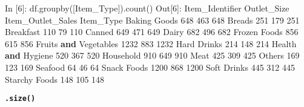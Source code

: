 \documentclass[
]{book}
\newenvironment{Shaded}{\begin{snugshade}}{\end{snugshade}}
\newcommand{\DecValTok}[1]{\textcolor[rgb]{0.00,0.00,0.81}{#1}}
\newcommand{\KeywordTok}[1]{\textcolor[rgb]{0.13,0.29,0.53}{\textbf{#1}}}
\newcommand{\NormalTok}[1]{#1}
\newcommand{\StringTok}[1]{\textcolor[rgb]{0.31,0.60,0.02}{#1}}
\begin{document}
\begin{Shaded}
\begin{Highlighting}[]
\NormalTok{In [}\DecValTok{6}\NormalTok{]: df.groupby([}\StringTok{\textquotesingle{}Item\_Type\textquotesingle{}}\NormalTok{]).count() }
\NormalTok{Out[}\DecValTok{6}\NormalTok{]:}
\NormalTok{                       Item\_Identifier  Outlet\_Size  Item\_Outlet\_Sales}
\NormalTok{Item\_Type                                                             }
\NormalTok{Baking Goods                       }\DecValTok{648}          \DecValTok{463}                \DecValTok{648}
\NormalTok{Breads                             }\DecValTok{251}          \DecValTok{179}                \DecValTok{251}
\NormalTok{Breakfast                          }\DecValTok{110}           \DecValTok{79}                \DecValTok{110}
\NormalTok{Canned                             }\DecValTok{649}          \DecValTok{471}                \DecValTok{649}
\NormalTok{Dairy                              }\DecValTok{682}          \DecValTok{496}                \DecValTok{682}
\NormalTok{Frozen Foods                       }\DecValTok{856}          \DecValTok{615}                \DecValTok{856}
\NormalTok{Fruits }\KeywordTok{and}\NormalTok{ Vegetables             }\DecValTok{1232}          \DecValTok{883}               \DecValTok{1232}
\NormalTok{Hard Drinks                        }\DecValTok{214}          \DecValTok{148}                \DecValTok{214}
\NormalTok{Health }\KeywordTok{and}\NormalTok{ Hygiene                 }\DecValTok{520}          \DecValTok{367}                \DecValTok{520}
\NormalTok{Household                          }\DecValTok{910}          \DecValTok{649}                \DecValTok{910}
\NormalTok{Meat                               }\DecValTok{425}          \DecValTok{309}                \DecValTok{425}
\NormalTok{Others                             }\DecValTok{169}          \DecValTok{123}                \DecValTok{169}
\NormalTok{Seafood                             }\DecValTok{64}           \DecValTok{46}                 \DecValTok{64}
\NormalTok{Snack Foods                       }\DecValTok{1200}          \DecValTok{868}               \DecValTok{1200}
\NormalTok{Soft Drinks                        }\DecValTok{445}          \DecValTok{312}                \DecValTok{445}
\NormalTok{Starchy Foods                      }\DecValTok{148}          \DecValTok{105}                \DecValTok{148}
\end{Highlighting}
\end{Shaded}

\textbf{\texttt{.size()}}
\end{document}
